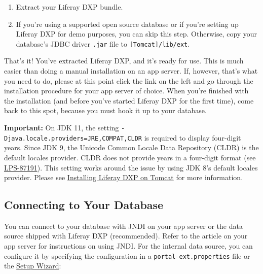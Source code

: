 \begin{enumerate}
\def\labelenumi{\arabic{enumi}.}
\tightlist
\item
  Extract your Liferay DXP bundle.
\item
  If you're using a supported open source database or if you're setting
  up Liferay DXP for demo purposes, you can skip this step. Otherwise,
  copy your database's JDBC driver \texttt{.jar} file to
  \texttt{{[}Tomcat{]}/lib/ext}.
\end{enumerate}

That's it! You've extracted Liferay DXP, and it's ready for use. This is
much easier than doing a manual installation on an app server. If,
however, that's what you need to do, please at this point click the link
on the left and go through the installation procedure for your app
server of choice. When you're finished with the installation (and before
you've started Liferay DXP for the first time), come back to this spot,
because you must hook it up to your database.

\noindent\hrulefill

\textbf{Important:} On JDK 11, the setting
\texttt{-Djava.locale.providers=JRE,COMPAT,CLDR} is required to display
four-digit years. Since JDK 9, the Unicode Common Locale Data Repository
(CLDR) is the default locales provider. CLDR does not provide years in a
four-digit format (see
\href{https://issues.liferay.com/browse/LPS-87191}{LPS-87191}). This
setting works around the issue by using JDK 8's default locales
provider. Please see
\href{/docs/7-1/deploy/-/knowledge_base/d/installing-product-on-tomcat\#configuring-tomcat}{Installing
Liferay DXP on Tomcat} for more information.

\noindent\hrulefill

\subsection{Connecting to Your
Database}\label{connecting-to-your-database}

You can connect to your database with JNDI on your app server or the
data source shipped with Liferay DXP (recommended). Refer to the article
on your app server for instructions on using JNDI. For the internal data
source, you can configure it by specifying the configuration in a
\texttt{portal-ext.properties} file or the
\href{/docs/7-1/deploy/-/knowledge_base/d/installing-liferay\#using-the-setup-wizard}{Setup
Wizard}:

